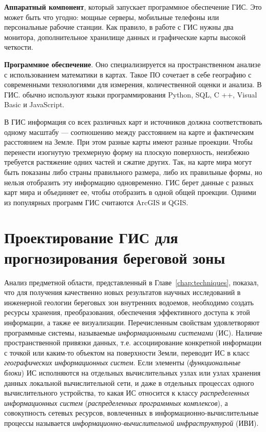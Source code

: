 \documentclass[732,fontsize=14pt,final]{studrep}
\begin{document}
\textbf{Аппаратный компонент}, который запускает программное обеспечение ГИС. Это может быть что угодно: мощные серверы, мобильные телефоны или персональные рабочие станции. Как правило, в работе с ГИС нужны два монитора, дополнительное хранилище данных и графические карты высокой четкости.

\textbf{Программное обеспечение}. Оно специализируется на пространственном анализе с использованием математики в картах. Такое ПО сочетает в себе географию с современными технологиями для измерения, количественной оценки и анализа. В ГИС. обычно используют языки программирования Python, SQL, C ++, Visual Basic и JavaScript.

В ГИС информация со всех различных карт и источников должна соответствовать одному масштабу — соотношению между расстоянием на карте и фактическим расстоянием на Земле. При этом разные карты имеют разные проекции. Чтобы перенести изогнутую трехмерную форму на плоскую поверхность, неизбежно требуется растяжение одних частей и сжатие других. Так, на карте мира могут быть показаны либо страны правильного размера, либо их правильные формы, но нельзя отобразить эту информацию одновременно. ГИС берет данные с разных карт мира и объединяет ее, чтобы отобразить в одной общей проекции. Одними из популярных программ ГИС считаются ArcGIS и QGIS.

\chapter{Проектирование ГИС для прогнозирования береговой зоны}\label{chap:proj}

Анализ предметной области, представленный в Главе~\ref{chap:techniques}, показал, что для получения качественно новых результатов научных исследований в инженерной геологии береговых зон внутренних водоемов, необходимо создать ресурсы хранения, преобразования, обеспечения эффективного доступа к этой информации, а также ее визуализации. Перечисленным свойствам удовлетворяют программные системы, называемые \emph{информационными системами} (ИС). Наличие пространственной привязки данных, т.е. ассоциирование конкретной информации с точкой или каким-то объектом на поверхности Земли, переводит ИС в класс \emph{географических информационных систем}. Если элементы (\emph{функциональные блоки}) ИС исполняются на отдельных вычислительных узлах или узлах хранения данных локальной вычислительной сети, и даже в отдельных процессах одного вычислительного устройства, то какая ИС относится к классу \emph{распределенных информационных систем} (\emph{распределенных программных комплексов}), а совокупность сетевых ресурсов, вовлеченных в информационно-вычислительные процессы называется \emph{информационно-вычислительной инфраструктурой} (ИВИ).
\end{document}
